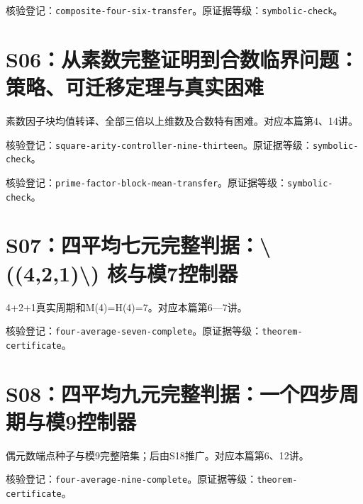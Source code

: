 核验登记：{\small\nolinkurl{composite-four-six-transfer}}。原证据等级：{\small\nolinkurl{symbolic-check}}。

\section{S06：从素数完整证明到合数临界问题：策略、可迁移定理与真实困难}\label{source:S06}

素数因子块均值转译、全部三倍以上维数及合数特有困难。对应本篇第4、14讲。

\par{}\par

核验登记：{\small\nolinkurl{square-arity-controller-nine-thirteen}}。原证据等级：{\small\nolinkurl{symbolic-check}}。

核验登记：{\small\nolinkurl{prime-factor-block-mean-transfer}}。原证据等级：{\small\nolinkurl{symbolic-check}}。

\section{S07：四平均七元完整判据：\textbackslash{}((4,2,1)\textbackslash{}) 核与模7控制器}\label{source:S07}

4+2+1真实周期和M(4)=H(4)=7。对应本篇第6—7讲。

\par{}\par

核验登记：{\small\nolinkurl{four-average-seven-complete}}。原证据等级：{\small\nolinkurl{theorem-certificate}}。

\section{S08：四平均九元完整判据：一个四步周期与模9控制器}\label{source:S08}

偶元数端点种子与模9完整陪集；后由S18推广。对应本篇第6、12讲。

\par{}\par

核验登记：{\small\nolinkurl{four-average-nine-complete}}。原证据等级：{\small\nolinkurl{theorem-certificate}}。

